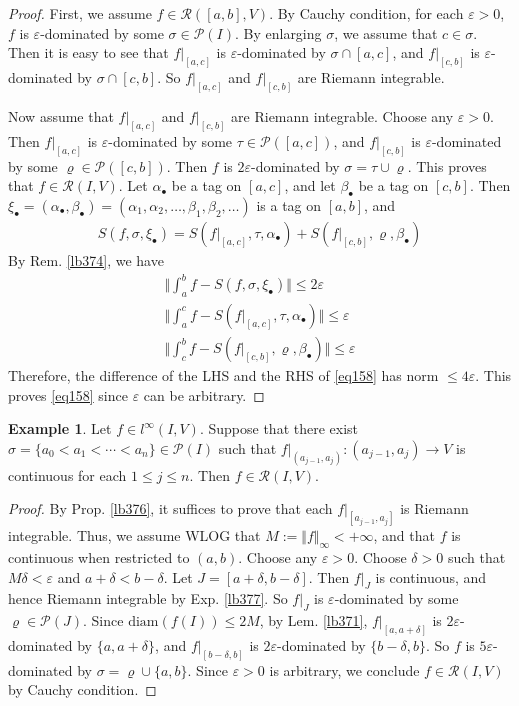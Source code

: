 \documentclass[12pt,b5paper,notitlepage]{article}
\theoremstyle{definition}
\newtheorem{eg}[df]{Example}
\theoremstyle{plain}
\newcommand{\mc}{\mathcal}
\newcommand{\scr}{\mathscr}
\newcommand{\blt}{\bullet}
\newcommand{\dps}{\displaystyle}
\newcommand{\diam}{\mathrm{diam}}
\newcommand{\eps}{\varepsilon}
\numberwithin{equation}{section}
\begin{document}
\begin{proof}
First, we assume $f\in\scr R([a,b],V)$. By Cauchy condition, for each $\eps>0$, $f$ is $\eps$-dominated by some $\sigma\in\mc P(I)$.  By enlarging $\sigma$, we assume that $c\in\sigma$. Then it is easy to see that $f|_{[a,c]}$ is $\eps$-dominated by $\sigma\cap[a,c]$, and $f|_{[c,b]}$ is $\eps$-dominated by $\sigma\cap[c,b]$. So $f|_{[a,c]}$ and $f|_{[c,b]}$ are Riemann integrable.

Now assume that $f|_{[a,c]}$ and $f|_{[c,b]}$ are Riemann integrable. Choose any $\eps>0$. Then $f|_{[a,c]}$ is $\eps$-dominated by some $\tau\in \mc P([a,c])$, and $f|_{[c,b]}$ is $\eps$-dominated by some $\varrho\in\mc P([c,b])$. Then $f$ is $2\eps$-dominated by $\sigma=\tau\cup\varrho$. This proves that $f\in\scr R(I,V)$. Let  $\alpha_\blt$ be a tag on $[a,c]$, and let $\beta_\blt$ be  a tag on $[c,b]$. Then $\xi_\blt=(\alpha_\blt,\beta_\blt)=(\alpha_1,\alpha_2,\dots,\beta_1,\beta_2,\dots)$ is a tag on $[a,b]$, and
\begin{align*}
S(f,\sigma,\xi_\blt)=S(f|_{[a,c]},\tau,\alpha_\blt)+S(f|_{[c,b]},\varrho,\beta_\blt)
\end{align*} 
By Rem. \ref{lb374}, we have
\begin{gather*}
\Big\Vert \int_a^b f-S(f,\sigma,\xi_\blt) \Big\Vert\leq 2\eps\\
\Big\Vert \int_a^c f-S(f|_{[a,c]},\tau,\alpha_\blt) \Big\Vert\leq \eps\\
\Big\Vert \int_c^b f-S(f|_{[c,b]},\varrho,\beta_\blt) \Big\Vert\leq \eps
\end{gather*}
Therefore, the difference of the LHS and the RHS of \eqref{eq158} has norm $\leq 4\eps$. This proves \eqref{eq158} since $\eps$ can be arbitrary.
\end{proof}



\begin{eg}\label{lb378}
Let $f\in l^\infty(I,V)$. Suppose that there exist $\sigma=\{a_0<a_1<\cdots<a_n\}\in\mc P(I)$ such that $\dps f|_{(a_{j-1},a_j)}:(a_{j-1},a_j)\rightarrow V$ is continuous for each $1\leq j\leq n$. Then $f\in\scr R(I,V)$.
\end{eg}

\begin{proof}
By Prop. \ref{lb376}, it suffices to prove that each $f|_{[a_{j-1},a_j]}$ is Riemann integrable. Thus, we assume WLOG that $M:=\Vert f\Vert_\infty<+\infty$, and that $f$ is continuous when restricted to $(a,b)$. Choose any $\eps>0$. Choose $\delta>0$ such that $M\delta<\eps$ and $a+\delta<b-\delta$. Let $J=[a+\delta,b-\delta]$. Then $f|_J$ is continuous, and hence Riemann integrable by Exp. \ref{lb377}. So $f|_J$ is $\eps$-dominated by some $\varrho\in\mc P(J)$. Since $\diam(f(I))\leq 2M$, by Lem. \ref{lb371}, $f|_{[a,a+\delta]}$ is $2\eps$-dominated by $\{a,a+\delta\}$, and $f|_{[b-\delta,b]}$ is $2\eps$-dominated by $\{b-\delta,b\}$. So $f$ is $5\eps$-dominated by $\sigma=\varrho\cup\{a,b\}$. Since $\eps>0$ is arbitrary, we conclude $f\in\scr R(I,V)$ by Cauchy condition.
\end{proof}
\end{document}
